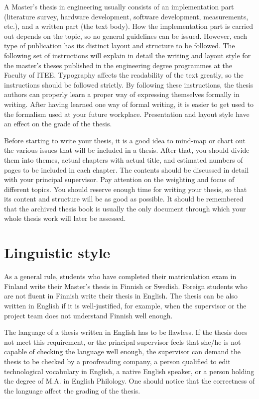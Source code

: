 A Master’s thesis in engineering usually consists of an implementation part (literature survey, hardware development, software development, measurements, etc.), and a written part (the text body). How the implementation part is carried out depends on the topic, so no general guidelines can be issued. However, each type of publication has its distinct layout and structure to be followed. The following set of instructions will explain in detail the writing and layout style for the master’s theses published in the engineering degree programmes at the Faculty of ITEE. Typography affects the readability of the text greatly, so the instructions should be followed strictly. By following these instructions, the thesis authors can properly learn a proper way of expressing themselves formally in writing. After having learned one way of formal writing, it is easier to get used to the formalism used at your future workplace. Presentation and layout style have an effect on the grade of the thesis.

Before starting to write your thesis, it is a good idea to mind-map or chart out the various issues that will be included in a thesis. After that, you should divide them into themes, actual chapters with actual title, and estimated numbers of pages to be included in each chapter. The contents should be discussed in detail with your principal supervisor. Pay attention on the weighting and focus of different topics. You should reserve enough time for writing your thesis, so that its content and structure will be as good as possible. It should be remembered that the archived thesis book is usually the only document through which your whole thesis work will later be assessed.

\section{Linguistic style}
\label{sec:linguistic_style}

As a general rule, students who have completed their matriculation exam in Finland write their Master’s thesis in Finnish or Swedish. Foreign students who are not fluent in Finnish write their thesis in English. The thesis can be also written in English if it is well-justified, for example, when the supervisor or the project team does not understand Finnish well enough. 

The language of a thesis written in English has to be flawless. If the thesis does not meet this requirement, or the principal supervisor feels that she/he is not capable of checking the language well enough, the supervisor can demand the thesis to be checked by a proofreading company, a person qualified to edit technological vocabulary in English, a native English speaker, or a person holding the degree of M.A. in English Philology. One should notice that the correctness of the language affect the grading of the thesis.

